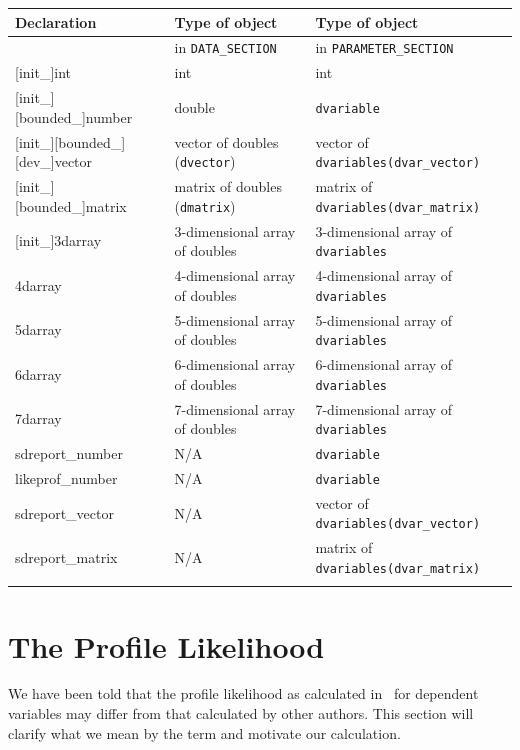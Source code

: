 \documentclass{admbmanual}
\newcommand\DS{\texttt{DATA\_SECTION}}
\newcommand\PS{\texttt{PARAMETER\_SECTION}}
\begin{document}
\begin{table}
\bgroup\footnotesize
\noindent\begin{tabular}{@{\vrule height 12pt depth 6pt width0pt}%
    @{\tt} l @{\qquad} l @{\qquad}  l}
\\
\hline
{\bf Declaration} & {\bf Type of object} & {\bf Type of object} \\[2pt]
\hline
&in \DS & in \PS \\[1em]
{[}init\_]int & int & int \\
{[}init\_]{[}bounded\_]number & double & \texttt{dvariable} \\
{[}init\_]{[}bounded\_]{[}dev\_]vector & vector of doubles (\texttt{dvector})
& vector of \texttt{dvariables(dvar\_vector)} \\
{[}init\_]{[}bounded\_]matrix & matrix of doubles (\texttt{dmatrix})
& matrix of \texttt{dvariables(dvar\_matrix)} \\
{[}init\_]3darray & 3-dimensional array of doubles
& 3-dimensional array of \texttt{dvariables} \\
4darray & 4-dimensional array of doubles
& 4-dimensional array of \texttt{dvariables} \\
5darray & 5-dimensional array of doubles
& 5-dimensional array of \texttt{dvariables} \\
6darray & 6-dimensional array of doubles
& 6-dimensional array of \texttt{dvariables} \\
7darray & 7-dimensional array of doubles
& 7-dimensional array of \texttt{dvariables} \\
sdreport\_number & N/A &\texttt{dvariable} \\
likeprof\_number & N/A &\texttt{dvariable} \\
sdreport\_vector & N/A &vector of \texttt{dvariables(dvar\_vector)} \\
sdreport\_matrix & N/A &matrix of \texttt{dvariables(dvar\_matrix)} \\[3pt]
\hline
\\
\end{tabular}
\emptycaption
\label{tab:type-declarations}
\egroup
\end{table}

\chapter{The Profile Likelihood}

We have been told that the profile likelihood as calculated in \ADM\ for
dependent variables may differ from that calculated by other authors. This
section will clarify what we mean by the term and motivate our calculation.
\end{document}
